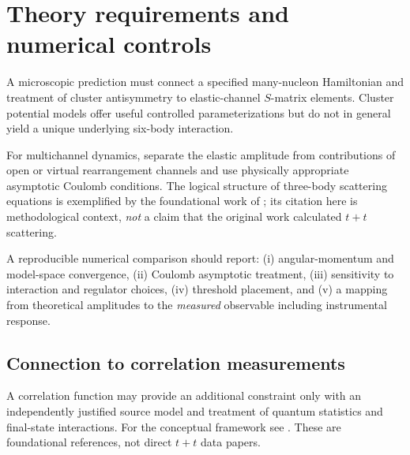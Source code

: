 \section{Theory requirements and numerical controls}\label{sec:tt-theory}
A microscopic prediction must connect a specified many-nucleon Hamiltonian and treatment of cluster antisymmetry to elastic-channel $S$-matrix elements. Cluster potential models offer useful controlled parameterizations but do not in general yield a unique underlying six-body interaction.

For multichannel dynamics, separate the elastic amplitude from contributions of open or virtual rearrangement channels and use physically appropriate asymptotic Coulomb conditions. The logical structure of three-body scattering equations is exemplified by the foundational work of \textcite{Faddeev1961}; its citation here is methodological context, \emph{not} a claim that the original work calculated $t+t$ scattering.

A reproducible numerical comparison should report: (i) angular-momentum and model-space convergence, (ii) Coulomb asymptotic treatment, (iii) sensitivity to interaction and regulator choices, (iv) threshold placement, and (v) a mapping from theoretical amplitudes to the \emph{measured} observable including instrumental response.

\subsection{Connection to correlation measurements}
A correlation function may provide an additional constraint only with an independently justified source model and treatment of quantum statistics and final-state interactions. For the conceptual framework see \textcite{Koonin1977,Lednicky1982}. These are foundational references, not direct $t+t$ data papers.
